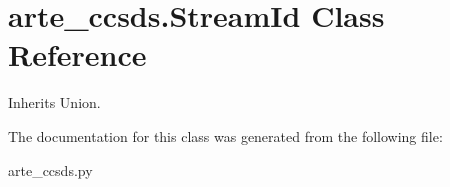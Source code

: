 \section{arte\+\_\+ccsds.\+Stream\+Id Class Reference}
\label{classarte__ccsds_1_1_stream_id}


Inherits Union.



The documentation for this class was generated from the following file\+:\begin{DoxyCompactItemize}
\item 
arte\+\_\+ccsds.\+py\end{DoxyCompactItemize}
